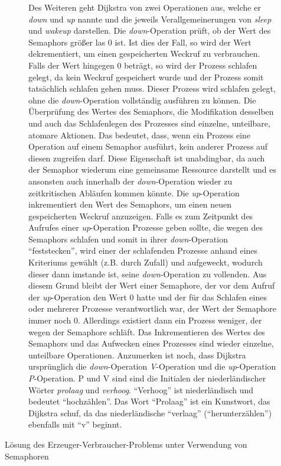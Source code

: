 \begin{description}
\begin{description}
								Des Weiteren geht Dijkstra von zwei Operationen aus, welche er \textit{down} und \textit{up} nannte und die jeweils Verallgemeinerungen von \textit{sleep} und \textit{wakeup} darstellen. Die \textit{down}-Operation prüft, ob der Wert des Semaphors größer las 0 ist. Ist dies der Fall, so wird der Wert dekrementiert, um einen gespeicherten Weckruf zu verbrauchen. Falls der Wert hingegen 0 beträgt, so wird der Prozess schlafen gelegt, da kein Weckruf gespeichert wurde und der Prozess somit tatsächlich schlafen gehen muss. Dieser Prozess wird schlafen gelegt, ohne die \textit{down}-Operation vollständig ausführen zu können. Die Überprüfung des Wertes des Semaphors, die Modifikation desselben und auch das Schlafenlegen des Prozesses sind einzelne, unteilbare, atomare Aktionen. Das bedeutet, dass, wenn ein Prozess eine Operation auf einem Semaphor ausführt, kein anderer Prozess auf diesen zugreifen darf. Diese Eigenschaft ist unabdingbar, da auch der Semaphor wiederum eine gemeinsame Ressource darstellt und es ansonsten auch innerhalb der \textit{down}-Operation wieder zu zeitkritischen Abläufen kommen könnte. Die \textit{up}-Operation inkrementiert den Wert des Semaphors, um einen neuen gespeicherten Weckruf anzuzeigen. Falls es zum Zeitpunkt des Aufrufes einer \textit{up}-Operation Prozesse geben sollte, die wegen des Semaphors schlafen und somit in ihrer \textit{down}-Operation "`feststecken"', wird einer der schlafenden Prozesse anhand eines Kriteriums gewählt (z.B. durch Zufall) und aufgeweckt, wodurch dieser dann imstande ist, seine \textit{down}-Operation zu vollenden. Aus diesem Grund bleibt der Wert einer Semaphore, der vor dem Aufruf der \textit{up}-Operation den Wert 0 hatte und der für das Schlafen eines oder mehrerer Prozesse verantwortlich war, der Wert der Semaphore immer noch 0. Allerdings existiert dann ein Prozess weniger, der wegen der Semaphore schläft. Das Inkrementieren des Wertes des Semaphors und das Aufwecken eines Prozesses sind wieder einzelne, unteilbare Operationen. Anzumerken ist noch, dass Dijkstra ursprünglich die \textit{down}-Operation \textit{V}-Operation und die \textit{up}-Operation \textit{P}-Operation. P und V sind sind die Initialen der niederländischer Wörter \textit{prolaag} und \textit{verhoog}. "`Verhoog"' ist niederländisch und bedeutet "`hochzählen"'. Das Wort "`Prolaag"' ist ein Kunstwort, das Dijkstra schuf, da das niederländische "`verlaag"' ("`herunterzählen"') ebenfalls mit "`v"' beginnt. \cite{SemaphorBorchert}\\

							\item[Lösung des Erzeuger-Verbraucher-Problems unter Verwendung von Semaphoren]
							

\end{description}
\end{description}
